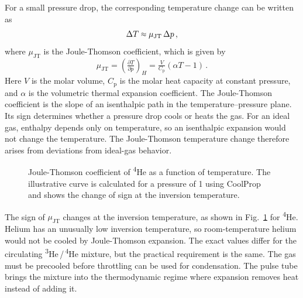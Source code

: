         For a small pressure drop, the corresponding temperature change can be written as
        \begin{equation}
            \Delta T \sapprox \mu_\mathrm{JT}\, \Delta p\,,
            \label{eq:setup:jt-temperature-change}
        \end{equation}
        where $\mu_\mathrm{JT}$ is the Joule-Thomson coefficient, which is given by
        \begin{equation}
            \mu_\mathrm{JT} = \left( \tfrac{\partial T}{\partial p} \right)_H = \tfrac{V}{C_\mathrm{p}} (\alpha T -1)\,.
            \label{eq:setup:jt-coefficient}
        \end{equation}
        Here $V$ is the molar volume, $C_\mathrm{p}$ is the molar heat capacity at constant pressure, and $\alpha$ is the volumetric thermal expansion coefficient. The Joule-Thomson coefficient is the slope of an isenthalpic path in the temperature--pressure plane. Its sign determines whether a pressure drop cools or heats the gas. For an ideal gas, enthalpy depends only on temperature, so an isenthalpic expansion would not change the temperature. The Joule-Thomson temperature change therefore arises from deviations from ideal-gas behavior.

        \begin{figure}
            \captionsetup{format=plain}%
            \centering
            \vspace{-1.5em}
            \vspace{-1.75em}
            \caption{Joule-Thomson coefficient of \textsuperscript{4}He as a function of temperature. The illustrative curve is calculated for a pressure of \qty{1}{\barunit} using CoolProp~\cite{bell_pure_2014} and shows the change of sign at the inversion temperature.}
            \label{fig:setup:joule-thomson}
        \end{figure}
        
        The sign of $\mu_\mathrm{JT}$ changes at the inversion temperature, as shown in Fig.~\ref{fig:setup:joule-thomson} for \textsuperscript{4}He. Helium has an unusually low inversion temperature, so room-temperature helium would not be cooled by Joule-Thomson expansion. The exact values differ for the circulating \textsuperscript{3}He\,/\,\textsuperscript{4}He mixture, but the practical requirement is the same. The gas must be precooled before throttling can be used for condensation. The pulse tube brings the mixture into the thermodynamic regime where expansion removes heat instead of adding it.

